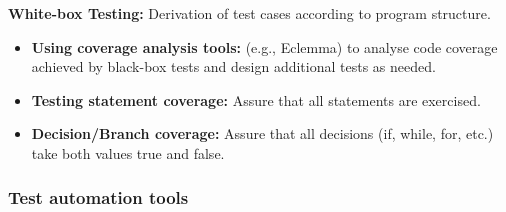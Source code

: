 \documentclass[../ESOF_notes.tex]{subfiles}
\begin{document}
\textbf{White-box Testing:} Derivation of test 
cases according to program structure.
\begin{itemize}
    \item \textbf{Using coverage analysis tools:} (e.g., Eclemma)
          to analyse code coverage achieved by black-box tests
          and design additional tests as needed.
    \item  \textbf{Testing statement coverage:} Assure that
          all statements are exercised.
    \item \textbf{Decision/Branch coverage:} Assure that all decisions
          (if, while, for, etc.) take both values true and false. 
\end{itemize}
\subsubsection{Test automation tools}
\end{document}
